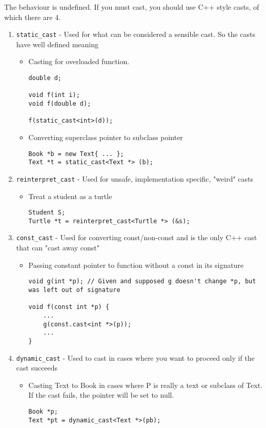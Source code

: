 \documentclass{article}
\begin{document}
The behaviour is undefined. If you must cast, you should use C++ style casts, of which there are 4. 
\begin{enumerate}
\item \verb|static_cast| - Used for what can be considered a sensible cast. So the casts have well defined meaning 
\begin{itemize}
\item Casting for overloaded function.
\begin{lstlisting}
double d;

void f(int i);
void f(double d);

f(static_cast<int>(d));
\end{lstlisting}
\item Converting superclass pointer to subclass pointer
\begin{lstlisting}
Book *b = new Text{ ... };
Text *t = static_cast<Text *> (b);
\end{lstlisting}

\end{itemize}

\item \verb|reinterpret_cast| - Used for unsafe, implementation specific, "weird" casts
\begin{itemize}
\item Treat a student as a turtle 
\begin{lstlisting}
Student S;
Turtle *t = reinterpret_cast<Turtle *> (&s);
\end{lstlisting}
\end{itemize}

\item \verb|const_cast| - Used for converting const/non-const and is the only C++ cast that can "cast away const"
\begin{itemize}
\item Passing constant pointer to function without a const in its signature
\begin{lstlisting}
void g(int *p); // Given and supposed g doesn't change *p, but was left out of signature

void f(const int *p) {
	...
	g(const.cast<int *>(p));
	...
}
\end{lstlisting}
\end{itemize}

\item \verb|dynamic_cast| - Used to cast in cases where you want to proceed only if the cast succeeds 
\begin{itemize}
\item Casting Text to Book in cases where P is really a text or subclass of Text. If the cast fails, the pointer will be set to null. 
\begin{lstlisting}
Book *p;
Text *pt = dynamic_cast<Text *>(pb);
\end{lstlisting}
\end{itemize}
\end{enumerate}
\end{document}
